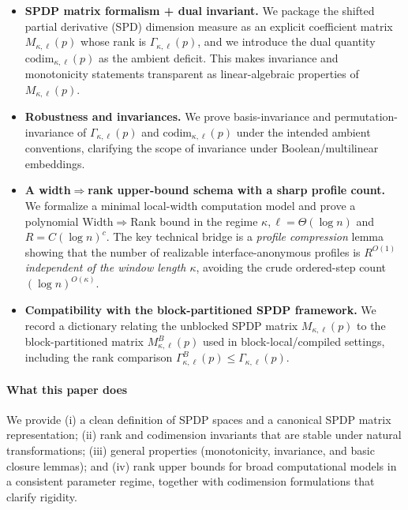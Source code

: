 \documentclass[12pt]{article}
\theoremstyle{definition}
\theoremstyle{remark}
\begin{document}
\begin{itemize}
  \item \textbf{SPDP matrix formalism + dual invariant.}
  We package the shifted partial derivative (SPD) dimension measure as an explicit
  coefficient matrix $M_{\kappa,\ell}(p)$ whose rank is $\Gamma_{\kappa,\ell}(p)$, and we
  introduce the dual quantity $\mathrm{codim}_{\kappa,\ell}(p)$ as the ambient deficit.
  This makes invariance and monotonicity statements transparent as linear-algebraic
  properties of $M_{\kappa,\ell}(p)$.

  \item \textbf{Robustness and invariances.}
  We prove basis-invariance and permutation-invariance of $\Gamma_{\kappa,\ell}(p)$ and
  $\mathrm{codim}_{\kappa,\ell}(p)$ under the intended ambient conventions, clarifying the
  scope of invariance under Boolean/multilinear embeddings.

  \item \textbf{A width$\Rightarrow$rank upper-bound schema with a sharp profile count.}
  We formalize a minimal local-width computation model and prove a polynomial
  Width$\Rightarrow$Rank bound in the regime $\kappa,\ell=\Theta(\log n)$ and
  $R=C(\log n)^c$.
  The key technical bridge is a \emph{profile compression} lemma showing that the number
  of realizable interface-anonymous profiles is $R^{O(1)}$ \emph{independent of the
  window length $\kappa$}, avoiding the crude ordered-step count $(\log n)^{O(\kappa)}$.

  \item \textbf{Compatibility with the block-partitioned SPDP framework.}
  We record a dictionary relating the unblocked SPDP matrix $M_{\kappa,\ell}(p)$ to the
  block-partitioned matrix $M^B_{\kappa,\ell}(p)$ used in block-local/compiled settings,
  including the rank comparison $\Gamma^B_{\kappa,\ell}(p)\le \Gamma_{\kappa,\ell}(p)$.
\end{itemize}

\paragraph{What this paper does}
We provide (i) a clean definition of SPDP spaces and a canonical SPDP matrix
representation; (ii) rank and codimension invariants that are stable under
natural transformations; (iii) general properties (monotonicity, invariance,
and basic closure lemmas); and (iv) rank upper bounds for broad computational
models in a consistent parameter regime, together with codimension formulations
that clarify rigidity.
\end{document}

